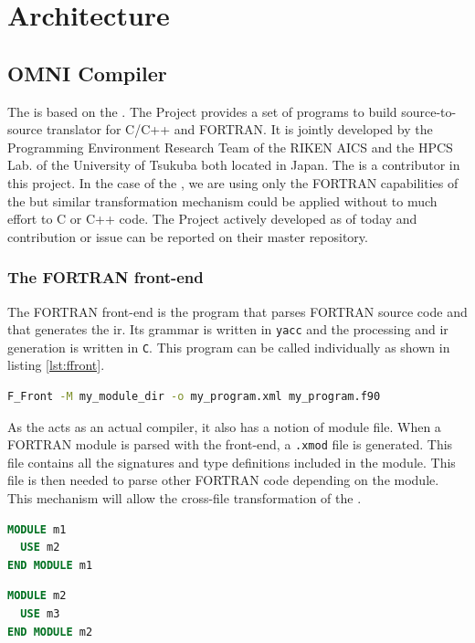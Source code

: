 \chapter{Architecture}
\section{OMNI Compiler}
The \clawfcomp is based on the \omni\cite{omni:website}. The \omni Project
provides a set of programs to build source-to-source translator for C/C++
and FORTRAN. It is jointly developed by the Programming Environment Research
Team of the RIKEN AICS and the HPCS Lab. of the University of Tsukuba both
located in Japan. The \clawfcomp is a contributor in this project.
In the case of the \clawfcomp, we are using only the FORTRAN
capabilities of the \omni but similar transformation mechanism could be
applied without to much effort to C or C++ code. The \omni Project
actively developed as of today and contribution or issue can be reported on
their master repository\cite{omni:github}.

\subsection{The FORTRAN front-end}
The FORTRAN front-end is the program that parses FORTRAN source code and that
generates the \gls{ir}. Its grammar is written in \lstinline|yacc| and the
processing and \gls{ir} generation is written in \lstinline|C|. This program
can be called individually as shown in listing \ref{lst:ffront}.

\begin{lstlisting}[label=lst:ffront, language=Bash, caption=Call F\_Front]
F_Front -M my_module_dir -o my_program.xml my_program.f90
\end{lstlisting}

As the \omni acts as an actual compiler, it also has a notion of module file.
When a FORTRAN module is parsed with the front-end, a \lstinline|.xmod| file is
generated. This file contains all the signatures and type definitions included
in the module. This file is then needed to parse other FORTRAN code depending
on the module. This mechanism will allow the cross-file transformation of the
\clawfcomp.

\begin{lstlisting}[label=lst:m1, language=Fortran, caption=module\_m1.f90]
MODULE m1
  USE m2
END MODULE m1
\end{lstlisting}

\begin{lstlisting}[label=lst:m2, language=Fortran, caption=module\_m2.f90]
MODULE m2
  USE m3
END MODULE m2
\end{lstlisting}

